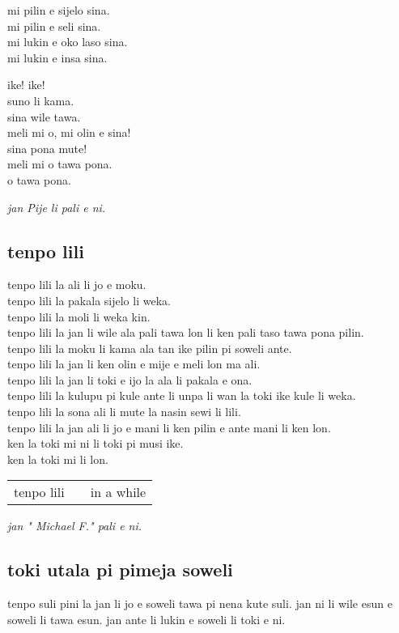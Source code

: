 mi pilin e sijelo sina. \\
mi pilin e seli sina. \\
mi lukin e oko laso sina. \\
mi lukin e insa sina.

ike! ike! \\
suno li kama. \\
sina wile tawa. \\
meli mi o, mi olin e sina! \\
sina pona mute! \\
meli mi o tawa pona. \\
o tawa pona.

\textit{jan Pije li pali e ni. \cite{www:Pije:01}}

\newpage

\subsection{tenpo lili}
tenpo lili la ali li jo e moku.     \\
tenpo lili la pakala sijelo li weka.     \\
tenpo lili la moli li weka kin.     \\
tenpo lili la jan li wile ala pali tawa lon li ken pali taso tawa pona
pilin.     \\
tenpo lili la moku li kama ala tan ike pilin pi soweli ante.     \\
tenpo lili la jan li ken olin e mije e meli lon ma ali.     \\
tenpo lili la jan li toki e ijo la ala li pakala e ona.     \\
tenpo lili la kulupu pi kule ante li unpa li wan la toki ike kule li
weka. \\
tenpo lili la sona ali li mute la nasin sewi li lili.     \\
tenpo lili la jan ali li jo e mani li ken pilin e ante mani li ken lon.     \\
ken la toki mi ni li toki pi musi ike.     \\
ken la toki mi li lon.

\begin{supertabular}{p{5,5cm}|ll}
    tenpo lili &  & in a while \\
\end{supertabular}

\textit{jan " Michael F."   pali e ni. \cite{www:failbluedot:01}}

\subsection{toki utala pi pimeja soweli}
tenpo suli pini la jan li jo e soweli tawa pi nena kute suli.
jan ni li wile esun e soweli li tawa esun.
jan ante li lukin e soweli li toki e ni.

